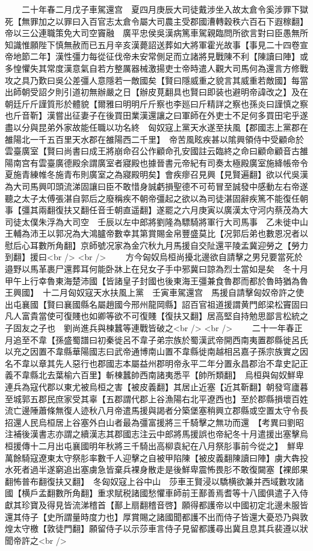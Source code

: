 　　二十年春二月戊子車駕還宫　夏四月庚辰大司徒戴涉坐入故太倉令奚涉罪下獄死【無罪加之以罪曰入百官志太倉令屬大司農主受郡國漕轉穀秩六百石下遐稼翻】帝以三公連職策免大司空竇融　廣平忠侯吳漢病篤車駕親臨問所欲言對曰臣愚無所知識惟願陛下慎無赦而已五月辛亥漢薨詔送葬如大將軍霍光故事【事見二十四卷宣帝地節二年】漢性彊力每從征伐帝未安常側足而立諸將見戰陳不利【陳讀曰陣】或多惶懼失其常度漢意氣自若方整厲器械激揚吏士帝時遣人觀大司馬何為還言方修戰攻之具乃歎曰吳公差彊人意隱若一敵國矣【賢曰隱威重之貌言其威重若敵國】每當出師朝受詔夕則引道初無辦嚴之日【辦皮莧翻具也賢曰即装也避明帝諱改之】及在朝廷斤斤謹質形於體貌【爾雅曰明明斤斤察也李廵曰斤精詳之察也孫炎曰謹慎之察也斤音靳】漢嘗出征妻子在後買田業漢還讓之曰軍師在外吏士不足何多買田宅乎遂盡以分與昆弟外家故能任職以功名終　匈奴寇上黨天水遂至扶風【郡國志上黨郡在雒陽北一千五百里天水郡在雒陽西二千里】　帝苦風眩疾甚以隂興領侍中受顧命於雲臺廣室【賢曰尚書曰成王將崩命召公作顧命孔安國註云臨終之命曰顧命顧音古雒陽南宫有雲臺廣德殿余謂廣室者寢殿也據晉書元帝紀有司奏太極殿廣室施絳帳帝令夏施青練帷冬施青布則廣室之為寢殿明矣】會疾瘳召見興【見賢遍翻】欲以代吳漢為大司馬興叩頭流涕固讓曰臣不敢惜身誠虧損聖德不可苟冒至誠發中感動左右帝遂聽之太子太傅張湛自郭后之廢稱疾不朝帝彊起之欲以為司徒湛固辭疾篤不能復任朝事【彊其兩翻復扶又翻任音壬朝直遥翻】遂罷之六月庚寅以廣漢太守河内蔡茂為大司徒太僕朱浮為大司空　壬辰以左中郎將劉隆為驃騎將軍行大司馬事　乙未徙中山王輔為沛王以郭况為大鴻臚帝數幸其第賞賜金帛豐盛莫比【况郭后弟也數恩况者以慰后心耳數所角翻】京師號况家為金穴秋九月馬援自交阯還平陵孟冀迎勞之【勞力到翻】援曰<br />
<br />
　　方今匈奴烏桓尚擾北邊欲自請擊之男兒要當死於邉野以馬革裹尸還葬耳何能卧牀上在兒女子手中邪冀曰諒為烈士當如是矣　冬十月甲午上行幸魯東海楚沛國【皆諸皇子封國也後東海王彊兼食魯郡而都於魯時猶為魯王興國】　十二月匈奴寇天水扶風上黨　壬寅車駕還宫　馬援自請擊匈奴帝許之使出屯襄國【賢曰襄國縣名屬趙國今邢州龍岡縣】詔百官祖道援謂黄門郎梁松竇固曰凡人富貴當使可復賤也如卿等欲不可復賤【復扶又翻】居高堅自持勉思鄙言松統之子固友之子也　劉尚進兵與棟蠶等連戰皆破之<br />
<br />
　　二十一年春正月追至不韋【孫盛蜀譜曰初秦徙呂不韋子弟宗族於蜀漢武帝開西南夷置郡縣徙呂氏以充之因置不韋縣華陽國志曰武帝通博南山置不韋縣徙南越相呂嘉子孫宗族實之因名不韋以章其先人惡行也郡國志本屬益州郡明帝永平二年分置永昌郡治不韋史記正義不韋縣北去葉榆六百里】斬棟蠶帥西南諸夷悉平【帥所類翻】　烏桓與匈奴鮮卑連兵為寇代郡以東尤被烏桓之害【被皮義翻】其居止近塞【近其靳翻】朝發穹廬暮至城郭五郡民庶家受其辜【五郡謂代郡上谷漁陽右北平遼西也】至於郡縣損壞百姓流亡邊陲蕭條無復人迹秋八月帝遣馬援與謁者分築堡塞稍興立郡縣或空置太守令長招還人民烏桓居上谷塞外白山者最為彊富援將三千騎擊之無功而還　【考異曰劉昭注補後漢書志亦謂之續漢志其郡國志注云中郎將馬援誤也帝紀冬十月遣援出塞擊烏桓援傳十二月出屯襄國明年秋將三千騎出高柳袁紀在八月祭肜事前今從之】　鮮卑萬餘騎寇遼東太守祭肜率數千人迎擊之自被甲陷陳【被皮義翻陳讀曰陣】虜大犇投水死者過半遂窮追出塞虜急皆棄兵裸身散走是後鮮卑震怖畏肜不敢復闚塞【裸郎果翻怖普布翻復扶又翻】　冬匈奴寇上谷中山　莎車王賢浸以驕横欲兼并西域數攻諸國【横戶孟翻數所角翻】重求賦税諸國愁懼車師前王鄯善焉耆等十八國俱遣子入侍獻其珍寶及得見皆流涕稽首【鄯上扇翻稽音啓】願得都護帝以中國初定北邊未服皆還其侍子【史所謂量時度力也】厚賞賜之諸國聞都護不出而侍子皆還大憂恐乃與敦煌太守檄【敦徒門翻】願留侍子以示莎車言侍子見留都護尋出冀且息其兵裴遵以狀聞帝許之<br />
